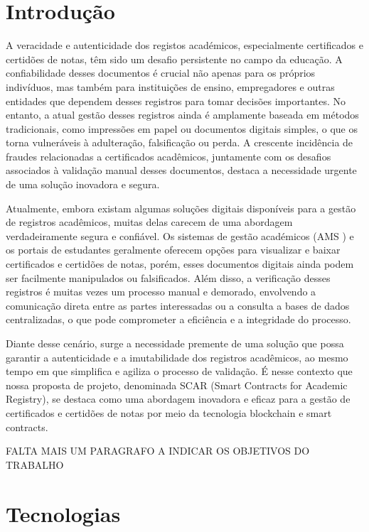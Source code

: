\documentclass[10pt]{article}
\begin{document}
\section{Introdução}

A veracidade e autenticidade dos registos académicos, especialmente certificados e certidões de notas,
têm sido um desafio persistente no campo da educação. A confiabilidade desses documentos é crucial não apenas
para os próprios indivíduos, mas também para instituições de ensino, empregadores e outras entidades que
dependem desses registros para tomar decisões importantes. No entanto, a atual gestão desses registros
ainda é amplamente baseada em métodos tradicionais, como impressões em papel ou documentos digitais simples,
o que os torna vulneráveis à adulteração, falsificação ou perda. A crescente incidência de fraudes
relacionadas a certificados acadêmicos, juntamente com os desafios associados à validação manual desses
documentos, destaca a necessidade urgente de uma solução inovadora e segura.

Atualmente, embora existam algumas soluções digitais disponíveis para a gestão de registros acadêmicos,
muitas delas carecem de uma abordagem verdadeiramente segura e confiável. Os sistemas de gestão académicos
(AMS \cite{LinWays}) e os portais de estudantes geralmente oferecem opções para visualizar e baixar certificados e certidões
de notas, porém, esses documentos digitais ainda podem ser facilmente manipulados ou falsificados. Além disso,
a verificação desses registros é muitas vezes um processo manual e demorado, envolvendo a comunicação direta entre
as partes interessadas ou a consulta a bases de dados centralizadas, o que pode comprometer a eficiência
e a integridade do processo.

Diante desse cenário, surge a necessidade premente de uma solução que possa garantir a autenticidade e a
imutabilidade dos registros acadêmicos, ao mesmo tempo em que simplifica e agiliza o processo de validação.
É nesse contexto que nossa proposta de projeto, denominada SCAR (Smart Contracts for Academic Registry),
se destaca como uma abordagem inovadora e eficaz para a gestão de certificados e certidões de notas por
meio da tecnologia blockchain e smart contracts.

FALTA MAIS UM PARAGRAFO A INDICAR OS OBJETIVOS DO TRABALHO

\section*{Tecnologias}
\end{document}

